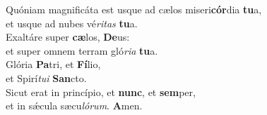 \oddverse Quóniam magnificáta est usque ad cælos miseri\textbf{cór}dia \textbf{tu}a,~\*\\
\oddverse et usque ad nubes vé\textit{ri}\textit{tas} \textbf{tu}a.\\
\evenverse Exaltáre super \textbf{cæ}los, \textbf{De}us:~\*\\
\evenverse et super omnem terram gló\textit{ri}\textit{a} \textbf{tu}a.\\
\oddverse Glória \textbf{Pa}tri, et \textbf{Fí}lio,~\*\\
\oddverse et Spirí\textit{tu}\textit{i} \textbf{San}cto.\\
\evenverse Sicut erat in princípio, et \textbf{nunc}, et \textbf{sem}per,~\*\\
\evenverse et in sǽcula sæcu\textit{ló}\textit{rum}. \textbf{A}men.\\
